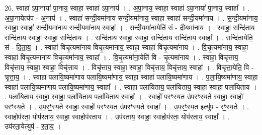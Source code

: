 \documentclass[17pt]{extarticle}
\begin{document}
26. स्वाहा॑ ऽपा॒नाया॑ पा॒नाय॒ स्वाहा॒ स्वाहा॑ ऽपा॒नाय॑ । . अ॒पा॒नाय॒ स्वाहा॒ स्वाहा॑ ऽपा॒नाया॑ पा॒नाय॒ स्वाहा᳚ । . अ॒पा॒नायेत्य॑प - अ॒नाय॑ । . स्वाहा॑ सन्दी॒यमा॑नाय सन्दी॒यमा॑नाय॒ स्वाहा॒ स्वाहा॑ सन्दी॒यमा॑नाय । . स॒न्दी॒यमा॑नाय॒ स्वाहा॒ स्वाहा॑ सन्दी॒यमा॑नाय सन्दी॒यमा॑नाय॒ स्वाहा᳚ । . स॒न्दी॒यमा॑ना॒येति॑ सं - दी॒यमा॑नाय । . स्वाहा॒ सन्दि॑ताय॒ सन्दि॑ताय॒ स्वाहा॒ स्वाहा॒ सन्दि॑ताय । . सन्दि॑ताय॒ स्वाहा॒ स्वाहा॒ सन्दि॑ताय॒ सन्दि॑ताय॒ स्वाहा᳚ । . सन्दि॑ता॒येति॒ सं - दि॒ता॒य॒ । . स्वाहा॑ विचृ॒त्यमा॑नाय विचृ॒त्यमा॑नाय॒ स्वाहा॒ स्वाहा॑ विचृ॒त्यमा॑नाय । . वि॒चृ॒त्यमा॑नाय॒ स्वाहा॒ स्वाहा॑ विचृ॒त्यमा॑नाय विचृ॒त्यमा॑नाय॒ स्वाहा᳚ । . वि॒चृ॒त्यमा॑ना॒येति॑ वि - चृ॒त्यमा॑नाय । . स्वाहा॒ विचृ॑त्ताय॒ विचृ॑त्ताय॒ स्वाहा॒ स्वाहा॒ विचृ॑त्ताय । . विचृ॑त्ताय॒ स्वाहा॒ स्वाहा॒ विचृ॑त्ताय॒ विचृ॑त्ताय॒ स्वाहा᳚ । . विचृ॑त्ता॒येति॒ वि - चृ॒त्ता॒य॒ । . स्वाहा॑ पलायि॒ष्यमा॑णाय पलायि॒ष्यमा॑णाय॒ स्वाहा॒ स्वाहा॑ पलायि॒ष्यमा॑णाय । . प॒ला॒यि॒ष्यमा॑णाय॒ स्वाहा॒ स्वाहा॑ पलायि॒ष्यमा॑णाय पलायि॒ष्यमा॑णाय॒ स्वाहा᳚ । . स्वाहा॒ पला॑यिताय॒ पला॑यिताय॒ स्वाहा॒ स्वाहा॒ पला॑यिताय । . पला॑यिताय॒ स्वाहा॒ स्वाहा॒ पला॑यिताय॒ पला॑यिताय॒ स्वाहा᳚ । . स्वाहो॑ परꣳस्य॒त उ॑परꣳस्य॒ते स्वाहा॒ स्वाहो॑ परꣳस्य॒ते । . उ॒प॒रꣳ॒॒स्य॒ते स्वाहा॒ स्वाहो॑ परꣳस्य॒त उ॑परꣳस्य॒ते स्वाहा᳚ । . उ॒प॒रꣳ॒॒स्य॒त इत्यु॑प - रꣳ॒॒स्य॒ते । . स्वाहोप॑रता॒ योप॑रताय॒ स्वाहा॒ स्वाहोप॑रताय । . उप॑रताय॒ स्वाहा॒ स्वाहोप॑रता॒ योप॑रताय॒ स्वाहा᳚ । . उप॑रता॒येत्युप॑ - र॒ता॒य॒ । \newline
\end{document}
